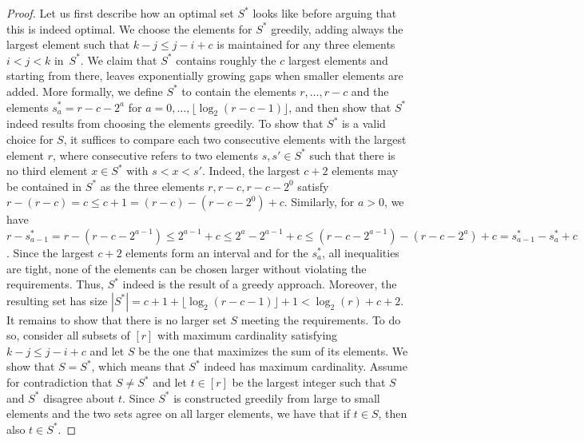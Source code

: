 \begin{proof}%
    Let us first describe how an optimal set $ S^* $ looks like before arguing that this is indeed optimal.
    We choose the elements for $ S^* $ greedily, adding always the largest element such that $ k - j \leq j - i + c $ is maintained for any three elements $ i < j < k $ in~$ S^* $.
    We claim that $ S^* $ contains roughly the $ c $ largest elements and starting from there, leaves exponentially growing gaps when smaller elements are added.
    More formally, we define $ S^* $ to contain the elements $ r, \dots, r - c $ and the elements $ s_a^* = r - c - 2^a $ for $ a = 0, \dots, \lfloor \log_2(r - c - 1) \rfloor $, and then show that $ S^* $ indeed results from choosing the elements greedily.
    To show that $ S^* $ is a valid choice for $ S $, it suffices to compare each two consecutive elements with the largest element $ r $, where consecutive refers to two elements $ s, s' \in S^* $ such that there is no third element $ x \in S^* $ with $ s < x < s' $.
    Indeed, the largest $ c + 2 $ elements may be contained in $ S^* $ as the three elements $ r, r-c, r - c - 2^0 $ satisfy $ r - (r - c) = c \leq c+1 = (r-c) - (r-c - 2^0) + c $.
    Similarly, for $ a > 0 $, we have 
    $ r - s_{a-1}^* 
    = r - (r - c - 2^{a-1}) 
    \leq 2^{a-1} + c
    \leq 2^{a} - 2^{a-1} + c
    \leq (r - c - 2^{a-1}) - (r - c - 2^{a}) + c
    = s_{a-1}^* - s_{a}^* + c$.
    Since the largest $ c + 2 $ elements form an interval and for the $ s_a^* $, all inequalities are tight, none of the elements can be chosen larger without violating the requirements.
    Thus, $ S^* $ indeed is the result of a greedy approach.
    Moreover, the resulting set has size $ |S^*| = c + 1 + \lfloor \log_2(r - c - 1) \rfloor + 1 < \log_2(r) + c + 2 $.
%
    It remains to show that there is no larger set $ S $ meeting the requirements. 
    To do so, consider all subsets of $ [r] $ with maximum cardinality satisfying $ k - j \leq j - i + c $ and let $ S $ be the one that maximizes the sum of its elements.
    We show that $ S = S^* $, which means that $ S^* $ indeed has maximum cardinality.
    Assume for contradiction that $S \neq S^*$ and let $ t \in [r] $ be the largest integer such that $ S $ and $ S^* $ disagree about $ t $. 
    Since $ S^* $ is constructed greedily from large to small elements and the two sets agree on all larger elements, we have that if $ t \in S $, then also $ t \in S^* $.

\end{proof}
